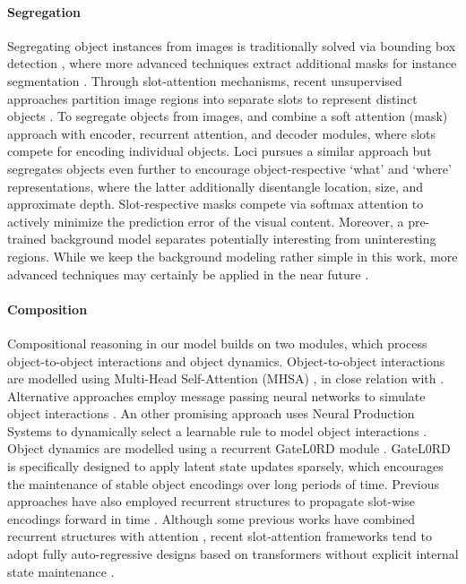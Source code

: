 \documentclass{article} \usepackage{iclr2023_conference_arxiv,times}
\begin{document}
\paragraph{Segregation}
Segregating object instances from images is traditionally solved via bounding box detection \citep{liu2016ssd,redmon2016you}, where more advanced techniques extract additional masks for instance segmentation \citep{carion2020end,dai2016instance,he2017mask}. Through slot-attention mechanisms, recent unsupervised approaches partition image regions into separate slots to represent distinct objects \citep{greff2019multi,locatello2020object}. To segregate objects from images, \citet{burgess2019monet} and \citet{von2020towards} combine a soft attention (mask) approach with encoder, recurrent attention, and decoder modules, where slots compete for encoding individual objects. 
Loci pursues a similar approach but segregates objects even further to encourage object-respective `what' and `where' representations, where the latter additionally disentangle location, size, and approximate depth.
Slot-respective masks compete via softmax attention to actively minimize the prediction error of the visual content.
Moreover, a pre-trained background model separates potentially interesting from uninteresting regions.
While we keep the background modeling rather simple in this work, more advanced techniques may certainly be applied in the near future 
\citep{ehrhardt2020relate,nguyen2020blockgan,niemeyer2021giraffe,van2020investigating}.

\paragraph{Composition}
Compositional reasoning in our model builds on two modules, which process object-to-object interactions and object dynamics.
Object-to-object interactions are modelled using Multi-Head Self-Attention (MHSA) \citep{vaswani2017attention}, in close relation with \citep{elsayed22savi++,kipf21savi}. 
Alternative approaches employ message passing neural networks to simulate object interactions \citep{battaglia2016interaction,chang2016compositional,janner2018reasoning}. An other promising approach uses Neural Production Systems to dynamically select a learnable rule to model object interactions \citep{alias2021neural}.
Object dynamics are modelled using a recurrent GateL0RD module \citep{gumbsch2021sparsely}. 
GateL0RD is specifically designed to apply latent state updates sparsely, which encourages the maintenance of stable object encodings over long periods of time.
Previous approaches have also employed recurrent structures to propagate slot-wise encodings forward in time \citep{jiang20scalor,kosiorek18sqair}.
Although some previous works have combined recurrent structures with attention \citep{goyal2019recurrent,goyal2020object}, recent slot-attention frameworks tend to adopt fully auto-regressive designs based on transformers without explicit internal state maintenance \citep{elsayed22savi++,kipf21savi,meinhardt21trackformer}.
\end{document}
